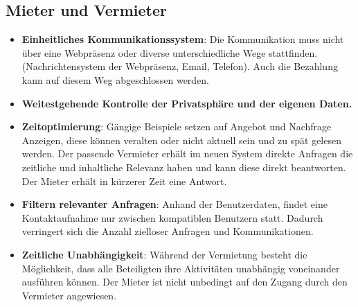 \subsection{Mieter und Vermieter}
\begin{itemize}
   \item
   \textbf{Einheitliches Kommunikationssystem}: Die Kommunikation muss nicht über eine Webpräsenz oder diverse unterschiedliche Wege stattfinden. (Nachrichtensystem der Webpräsenz, Email, Telefon). Auch die Bezahlung kann auf diesem Weg abgeschlossen werden.

   \item 
   \textbf{Weitestgehende Kontrolle der Privatsphäre und der eigenen Daten.}

   \item 
   \textbf{Zeitoptimierung}: Gängige Beispiele setzen auf Angebot und Nachfrage Anzeigen, diese können veralten oder nicht aktuell sein und zu spät gelesen werden. Der passende Vermieter erhält im neuen System direkte Anfragen die zeitliche und inhaltliche Relevanz haben und kann diese direkt beantworten. Der Mieter erhält in kürzerer Zeit eine Antwort.

   \item
   \textbf{Filtern relevanter Anfragen}: Anhand der Benutzerdaten, findet eine Kontaktaufnahme nur zwischen kompatiblen Benutzern statt. Dadurch verringert sich die Anzahl zielloser Anfragen und Kommunikationen.

   \item 
   \textbf{Zeitliche Unabhängigkeit}: Während der Vermietung besteht die Möglichkeit, dass alle Beteiligten ihre Aktivitäten unabhängig voneinander ausführen können. Der Mieter ist nicht unbedingt auf den Zugang durch den Vermieter angewiesen.

\end{itemize}


